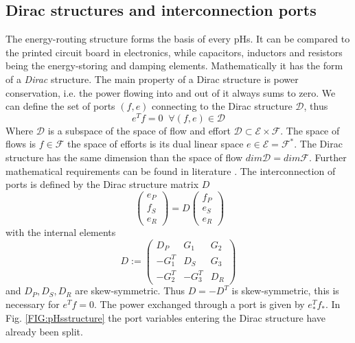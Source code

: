 \documentclass[a4paper,twoside, openright,12pt]{report}
\begin{document}
\subsection{Dirac structures and interconnection ports} \label{SS:PHSinterconnection}
The energy-routing structure forms the basis of every pHs. It can be compared to the printed circuit board in electronics, while capacitors, inductors and resistors being the energy-storing and damping elements. Mathematically it has the form of a \emph{Dirac} structure. The main property of a Dirac structure is power conservation, i.e. the power flowing into and out of it always sums to zero. We can define the set of ports $(f,e)$ connecting to the Dirac structure $\mathcal{D}$, thus 
\begin{equation}
e^Tf = 0 \;  \; \forall (f,e)\in\mathcal{D}
\end{equation}
Where $\mathcal{D}$ is a subspace of the space of flow and effort $\mathcal{D} \subset \mathcal{E}\times \mathcal{F}$. The space of flows is $f \in \mathcal{F}$ the space of efforts is its dual linear space $e \in \mathcal{E} = \mathcal{F}^*$. The Dirac structure has the same dimension than the space of flow $dim \mathcal{D} = dim \mathcal{F}$.
Further mathematical requirements can be found in literature \cite{vanderSchaft_06,Schaft_14}. The interconnection of ports is defined by the Dirac structure matrix $D$
\begin{equation}\
\begin{pmatrix}
e_P \\ f_S \\ e_R
\end{pmatrix} = D \begin{pmatrix}
f_P \\ e_S \\ e_R
\end{pmatrix}
\end{equation}
with the internal elements
\begin{equation}
D :=  \begin{pmatrix}
D_P & G_1 & G_2 \\ -G_1^T & D_S & G_3 \\ -G_2^T & -G_3^T & D_R 
\end{pmatrix}
\end{equation}
and $D_P,D_S,D_R$ are skew-symmetric. Thus $D = -D^T$ is skew-symmetric, this is necessary for $e^Tf=0$.
The power exchanged through a port is given by $ e_*^Tf_*$. In Fig. \ref{FIG:pHsstructure} the port variables entering the Dirac structure have already been split. 
\end{document}
